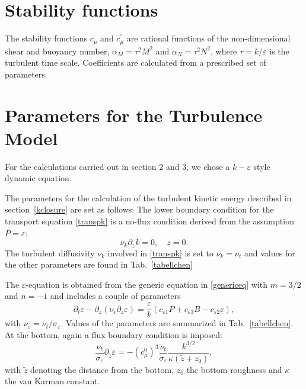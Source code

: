 \section{Stability functions}

The stability functions $c_\mu$ and $c_\mu^\prime$ are rational functions of 
the non-dimensional shear and buoyancy number, $\alpha_M = \tau^2 M^2$ and 
$\alpha_N = \tau^2 N^2$, where $\tau = k \slash \varepsilon $ is the turbulent 
time scale. Coefficients are calculated from a prescribed set of parameters. 

\section{Parameters for the Turbulence Model}

For the calculations carried out in section 2 and 3, we chose a $k-\varepsilon$ 
style dynamic equation.

The parameters for the calculation of the turbulent kinetic energy described in 
section\ \ref{kclosure} are set as follows: The lower boundary condition for 
the transport equation \eqref{transpk} is a no-flux condition derived from the 
assumption $P=\varepsilon$:
\begin{equation}
 \label{lowerBC}
 \nu_k \partial_z k = 0, \quad z=0.
\end{equation}
The turbulent diffusivity $\nu_k$ involved in \eqref{transpk} is set to $\nu_k 
= \nu_t$ and values for the other parameters are found in Tab.\ \ref{tabellchen}

The $\varepsilon$-equation is obtained from the generic equation in 
\eqref{genericeq} with $m=3\slash 2$ and $n=-1$ and includes a couple of 
parameters
\begin{equation}
 \label{transpeps}
 \partial_t \varepsilon - \partial_z ( \nu_\varepsilon \partial_z \varepsilon) 
= \frac{\varepsilon}{k} (c_{\varepsilon 1}P + c_{\varepsilon 3} B 
-c_{\varepsilon 2} \varepsilon),
\end{equation}
with $\nu_\varepsilon = \nu_t \slash \sigma_\varepsilon$. Values of the 
parameters are summarized in Tab.\ \ref{tabellchen}. At the bottom, again a 
flux boundary condition is imposed:
\begin{equation}
 \label{epsBC}
 \frac{\nu_t}{\sigma_\varepsilon} \partial_{\tilde{z}} \varepsilon = - 
(c_\mu^0)^3  \frac{\nu_t}{\sigma_\varepsilon} \frac{k^{3 \slash 2}}{\kappa 
(\tilde{z} +z_0)},
\end{equation}
with $\tilde{z}$ denoting the distance from the bottom, $z_0$ the bottom 
roughness and $\kappa$ the van Karman constant.

